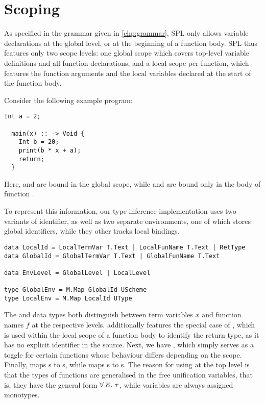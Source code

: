 

\section{Scoping}
As specified in the grammar given in \cref{chp:grammar}, SPL only allows
variable declarations at the global level, or at the beginning of a function
body. SPL thus features only two scope levels: one global scope which covers
top-level variable definitions and all function declarations, and a local scope
per function, which features the function arguments and the local variables
declared at the start of the function body.

Consider the following example program:
%
\begin{lstlisting}[language=SPL]
  Int a = 2;

  main(x) :: -> Void {
    Int b = 20;
    print(b * x + a);
    return;
  }
\end{lstlisting}
%
Here,  and  are bound in the global scope, while  and
 are bound only in the body of function .

To represent this information, our type inference implementation uses two
variants of identifier, as well as two separate environments, one of which
stores global identifiers, while they other tracks local bindings.

\begin{verbatim}
data LocalId = LocalTermVar T.Text | LocalFunName T.Text | RetType
data GlobalId = GlobalTermVar T.Text | GlobalFunName T.Text

data EnvLevel = GlobalLevel | LocalLevel

type GlobalEnv = M.Map GlobalId UScheme
type LocalEnv = M.Map LocalId UType
\end{verbatim}

The  and  data types both distinguish between
term variables $x$ and function names $f$ at the respective levels.
 additionally features the special case of ,
which is used within the local scope of a function body to identify the return
type, as it has no explicit identifier in the source.
Next, we have , which simply serves as a toggle for certain
functions whose behaviour differs depending on the scope.
Finally,  maps s to s,
while  maps s to s.
The reason for using  at the top level is that the types of
functions are generalised in the free unification variables, that is, they have
the general form $\forall\ \set{\alpha}.\ \tau$, while variables are always
assigned monotypes.


